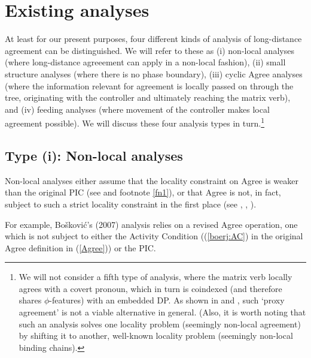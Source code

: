 \documentclass[output=paper
,modfonts
,nonflat]{langsci/langscibook}
\begin{document}
	
	\section{Existing analyses} \label{sec-bjoe-muel:2}
	
	At least for our present purposes, four different kinds of analysis
	of long-distance agreement can be distinguished. We will refer to
	these as (i) non-local analyses (where long-distance agreeement can
	apply in a non-local fashion),  (ii) small structure analyses (where
	there is no phase boundary), (iii) cyclic Agree analyses (where the
	information relevant for agreement is locally passed on through the
	tree, originating with the controller and ultimately reaching the
	matrix verb), and (iv) feeding analyses (where movement
	of the controller makes 
	local agreement possible). We will discuss these four analysis types in
	turn.\footnote{We will not consider a fifth type of analysis, where
		the matrix verb locally agrees with a covert pronoun, which in turn
		is coindexed (and therefore shares $\phi$-features) with an
		embedded DP. As shown in \citet{PolinskyPotsdam:01} and
		\citet{BhattKeine:16:lon}, such `proxy agreement' is not a viable
		alternative in general. (Also, it is worth noting that such an
		analysis solves one locality problem (seemingly non-local agreement)
		by shifting it to another, well-known locality problem (seemingly
		non-local binding chains).}
	
	\subsection{Type (i): Non-local analyses}
	
	Non-local analyses either assume that the locality constraint on Agree
	is weaker than the original PIC (see \citealt{Chomsky:01} and footnote
	\ref{fn1}), or that Agree is not, in fact, subject to such a strict
	locality constraint in the first place (see \citealt{Sells:06}, \citealt{Boskovic:07},
	\citealt{Keine:16}).
	
	For example, Bo\v{s}kovi{\'c}'s (2007) analysis relies on a revised
	Agree operation, one which is not subject to either the  Activity
	Condition ((\ref{boerj:AC}) in the original Agree definition in
	(\ref{Agree})) or the PIC. 
	
\end{document}
